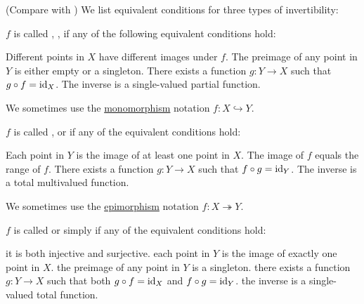 \begin{definition}\label{def:function_invertibility}(Compare with )
  We list equivalent conditions for three types of invertibility:
  \begin{DefEnum}
     \( f \) is called , ,  if any of the following equivalent conditions hold:
    \begin{DefEnum}
       Different points in \( X \) have different images under \( f \).
       The preimage of any point in \( Y \) is either empty or a singleton.
       There exists a function \( g: Y \to X \) such that \( g \circ f = \operatorname{id}_X \).
       The inverse is a single-valued partial function.
    \end{DefEnum}

    We sometimes use the \hyperref[def:morphism_invertibility/monomorphism]{monomorphism} notation \( f: X \hookrightarrow Y \).

     \( f \) is called ,  or  if any of the equivalent conditions hold:
    \begin{DefEnum}
       Each point in \( Y \) is the image of at least one point in \( X \).
       The image of \( f \) equals the range of \( f \).
       There exists a function \( g: Y \to X \) such that \( f \circ g = \operatorname{id}_Y \).
       The inverse is a total multivalued function.
    \end{DefEnum}

    We sometimes use the \hyperref[def:morphism_invertibility/epimorphism]{epimorphism} notation \( f: X \twoheadrightarrow Y \).

     \( f \) is called  or simply  if any of the equivalent conditions hold:
    \begin{DefEnum}
       it is both injective and surjective.
       each point in \( Y \) is the image of exactly one point in \( X \).
       the preimage of any point in \( Y \) is a singleton.
       there exists a function \( g: Y \to X \) such that both \( g \circ f = \operatorname{id}_X \) and \( f \circ g = \operatorname{id}_Y \).
       the inverse is a single-valued total function.
    \end{DefEnum}


\end{DefEnum}
\end{definition}
